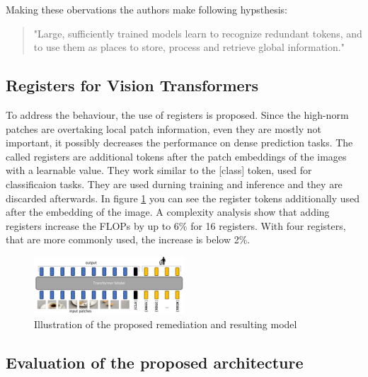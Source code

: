 \documentclass[conference]{IEEEtran}
\begin{document}
  Making these obervations the authors make following hypsthesis:
  \begin{quote}
    "Large, sufficiently trained models learn to recognize redundant tokens, and to use them as places to store, process and retrieve global information." \cite{registers}
  \end{quote}

  \subsection{Registers for Vision Transformers}


  To address the behaviour, the use of registers is proposed. Since the high-norm patches are overtaking local patch information, even they are mostly not important, it possibly decreases the performance on dense prediction tasks. The called registers are additional tokens after the patch embeddings of the images with a learnable value. They work similar to the [class] token, used for classificaion tasks. They are used durning training and inference and they are discarded afterwards. In figure \ref{fig:register-architecture} you can see the register tokens additionally used after the embedding of the image. A complexity analysis show that adding registers increase the FLOPs by up to 6\% for 16 registers. With four registers, that are more commonly used, the increase is below 2\%.

  \begin{figure}
    \centering
    \includegraphics[width=0.5\textwidth]{figures/register-architecture.png}
    \caption{Illustration of the proposed remediation and resulting model \cite{registers}}
    \label{fig:register-architecture}
  \end{figure}

  \subsection{Evaluation of the proposed architecture}
\end{document}
